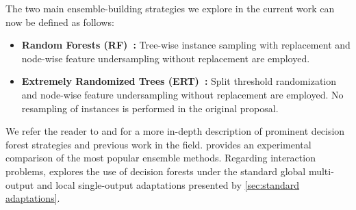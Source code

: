 The two main ensemble-building strategies we explore in the current work can now be defined as follows:
%
\begin{itemize}
    \item \textbf{Random Forests (RF)~\cite{breiman2001random}:} Tree-wise instance sampling with replacement and node-wise feature undersampling without replacement are employed.
    \item \textbf{Extremely Randomized Trees (ERT)~\cite{geurts2006extremely}:} Split threshold randomization and node-wise feature undersampling without replacement are employed. No resampling of instances is performed in the original proposal.
\end{itemize}


We refer the reader to  and  for a more in-depth description of prominent decision forest strategies and previous work in the field.  provides an experimental comparison of the most popular ensemble methods.  %
%
Regarding interaction problems,  explores the use of decision forests under the standard global multi-output and local single-output adaptations presented by \autoref{sec:standard adaptations}.

